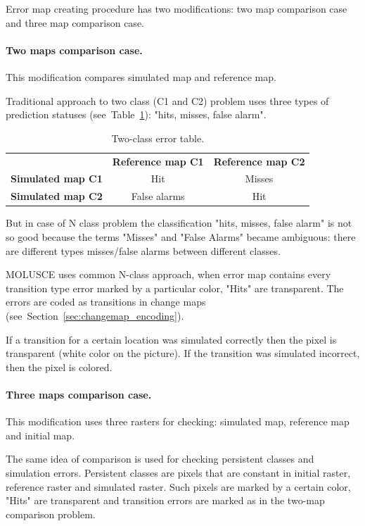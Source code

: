 \documentclass{report}
\begin{document}
Error map creating procedure has two modifications: two map comparison case and three map comparison case. 

\paragraph{Two maps comparison case.}
This modification compares simulated map and reference map.

Traditional approach to two class (C1 and C2) problem uses three types of prediction statuses (see~Table~\ref{tab:2classET}): "hits, misses, false alarm".

\begin{table}
\centering
\caption{Two-class error table.}
\begin{tabular}{lcc}
   & \bf{Reference map C1} & \bf{Reference map C2}   \\
 \bf{Simulated map C1} & Hit & Misses \\
 \bf{Simulated map C2} & False alarms & Hit 
\end{tabular}
\label{tab:2classET}
\end{table}

But in case of N class problem the classification "hits, misses, false alarm" is not so good because the terms "Misses" and "False Alarms" became ambiguous: there are different types misses/false alarms between different classes.

MOLUSCE uses common N-class approach, when error map contains every transition type error marked by a particular color, "Hits" are transparent. The errors are coded as transitions in change maps (see~Section~\ref{sec:changemap_encoding}).

If a transition for a certain location was simulated correctly then the pixel is transparent (white color on the picture). If the transition was simulated incorrect, then the pixel is colored.

\paragraph{Three maps comparison case.}
This modification uses three rasters for checking: simulated map, reference map and initial map.

The same idea of comparison is used for checking persistent classes and simulation errors. Persistent classes are pixels that are constant in initial raster, reference raster and simulated raster. Such pixels are marked by a certain color, "Hits" are transparent and transition errors are marked as in the two-map comparison problem. 



\end{document}
